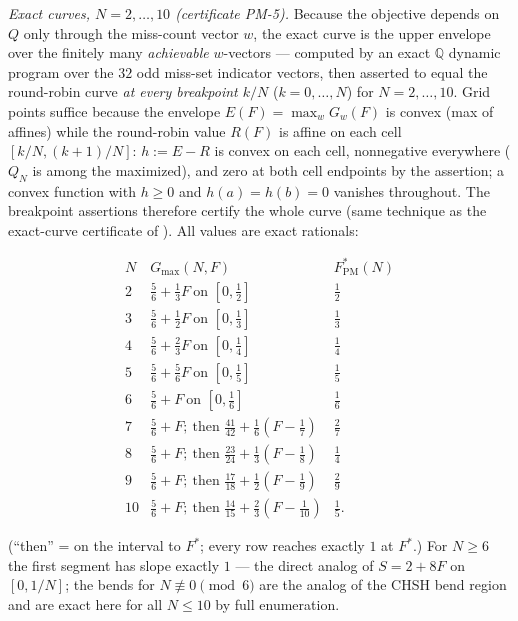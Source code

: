 \documentclass[aps,pra,reprint,superscriptaddress,floatfix]{revtex4-2}
\begin{document}
\emph{Exact curves, $N=2,\dots,10$ (certificate PM-5).} Because the
objective depends on $Q$ only through the miss-count vector $w$, the exact
curve is the upper envelope over the finitely many \emph{achievable}
$w$-vectors --- computed by an exact $\mathbb{Q}$ dynamic program over the
$32$ odd miss-set indicator vectors, then asserted to equal the
round-robin curve \emph{at every breakpoint $k/N$} ($k=0,\dots,N$) for
$N=2,\dots,10$. Grid points suffice because the envelope $E(F)=\max_{w}
G_{w}(F)$ is convex (max of affines) while the round-robin value $R(F)$ is
affine on each cell $[k/N,(k+1)/N]$: $h:=E-R$ is convex on each cell,
nonnegative everywhere ($Q_{N}$ is among the maximized), and zero at both
cell endpoints by the assertion; a convex function with $h\ge 0$ and
$h(a)=h(b)=0$ vanishes throughout. The breakpoint assertions therefore
certify the whole curve (same technique as the exact-curve certificate of
\cite{mainpaper2026}). All values are exact rationals:

\begin{equation*}
\begin{array}{c|l|c}
N & G_{\max}(N,F) & F^{*}_{\mathrm{PM}}(N)\\
\hline
2 & \tfrac56+\tfrac13 F\ \text{on }[0,\tfrac12] & \tfrac12\\
3 & \tfrac56+\tfrac12 F\ \text{on }[0,\tfrac13] & \tfrac13\\
4 & \tfrac56+\tfrac23 F\ \text{on }[0,\tfrac14] & \tfrac14\\
5 & \tfrac56+\tfrac56 F\ \text{on }[0,\tfrac15] & \tfrac15\\
6 & \tfrac56+F\ \text{on }[0,\tfrac16] & \tfrac16\\
7 & \tfrac56+F;\ \text{then } \tfrac{41}{42}+\tfrac16(F-\tfrac17) & \tfrac27\\
8 & \tfrac56+F;\ \text{then } \tfrac{23}{24}+\tfrac13(F-\tfrac18) & \tfrac14\\
9 & \tfrac56+F;\ \text{then } \tfrac{17}{18}+\tfrac12(F-\tfrac19) & \tfrac29\\
10 & \tfrac56+F;\ \text{then } \tfrac{14}{15}+\tfrac23(F-\tfrac1{10}) & \tfrac15.
\end{array}
\end{equation*}

(``then'' = on the interval to $F^{*}$; every row reaches exactly $1$ at
$F^{*}$.) For $N\ge 6$ the first segment has slope exactly $1$ --- the
direct analog of $S=2+8F$ on $[0,1/N]$; the bends for
$N\not\equiv 0\pmod 6$ are the analog of the {CHSH} bend region and are
exact here for all $N\le 10$ by full enumeration.
\end{document}
